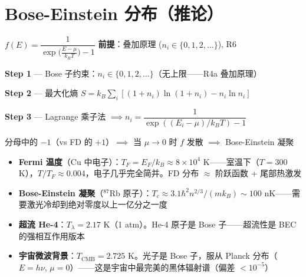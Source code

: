 \section{Bose-Einstein 分布（推论）}

\begin{lawbox}
  $f(E) = \dfrac{1}{\exp\!\big(\frac{E-\mu}{k_B T}\big) - 1}$
  \quad\textbf{前提}：叠加原理 ($n_i \in \{0,1,2,\dots\}$), R6
\end{lawbox}

\begin{derivationbox}[推导]
  \textbf{Step 1} — Bose 子约束：$n_i \in \{0,1,2,\dots\}$（无上限——R4a 叠加原理）

  \textbf{Step 2} — 最大化熵 $S = k_B\sum_i[(1+n_i)\ln(1+n_i) - n_i\ln n_i]$

  \textbf{Step 3} — Lagrange 乘子法 $\implies n_i = \dfrac{1}{\exp((E_i-\mu)/k_B T) - 1}$

  分母中的 $-1$（vs FD 的 $+1$）$\implies$ 当 $\mu \to 0$ 时 $f$ 发散 $\implies$ Bose-Einstein 凝聚
\end{derivationbox}


\begin{oombox}[量子统计的临界温度]
  \begin{itemize}
    \item \textbf{Fermi 温度}（Cu 中电子）：$T_F = E_F/k_B \approx 8\times 10^4$ K——室温下（$T=300$ K），$T/T_F \approx 0.004$，电子几乎完全简并。FD 分布 $\approx$ 阶跃函数 + 尾部热激发
    \item \textbf{Bose-Einstein 凝聚}（$^{87}$Rb 原子）：$T_c \approx 3.1\hbar^2 n^{2/3}/(mk_B) \sim 100$ nK——需要激光冷却到绝对零度以上一亿分之一度
    \item \textbf{超流 He-4}：$T_\lambda = 2.17$ K（1 atm）。He-4 原子是 Bose 子——超流性是 BEC 的强相互作用版本
    \item \textbf{宇宙微波背景}：$T_{\text{CMB}} = 2.725$ K。光子是 Bose 子，服从 Planck 分布（$E=h\nu$, $\mu=0$）——这是宇宙中最完美的黑体辐射谱（偏差 $<10^{-5}$）
  \end{itemize}
\end{oombox}

